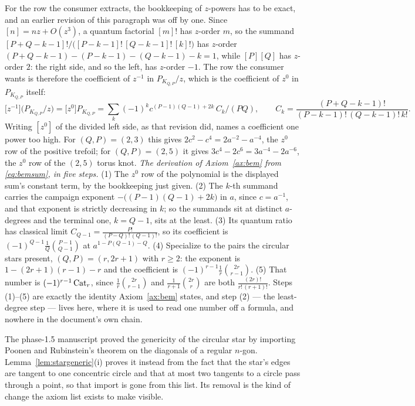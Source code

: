 \begin{remark}
For the row the consumer extracts, the bookkeeping of $z$-powers has to be
exact, and an earlier revision of this paragraph was off by one. Since
$[n]=nz+O(z^3)$, a quantum factorial $[m]!$ has $z$-order $m$, so the summand
$[P+Q-k-1]!/\bigl([P-k-1]!\,[Q-k-1]!\,[k]!\bigr)$ has $z$-order
$(P+Q-k-1)-(P-k-1)-(Q-k-1)-k=1$, while $[P][Q]$ has $z$-order $2$: the right
side, and so the left, has $z$-order $-1$. The row the consumer wants is
therefore the coefficient of $z^{-1}$ in $P_{K_{Q,P}}/z$, which is the
coefficient of $z^0$ in $P_{K_{Q,P}}$ itself:
\[
   \bigl[z^{-1}\bigr]\bigl(P_{K_{Q,P}}/z\bigr)
   =\bigl[z^{0}\bigr]P_{K_{Q,P}}
   =\sum_k(-1)^k c^{(P-1)(Q-1)+2k}\,C_k/(PQ),
   \qquad
   C_k=\frac{(P+Q-k-1)!}{(P-k-1)!\,(Q-k-1)!\,k!} .
\]
Writing $[z^0]$ of the divided left side, as that revision did, names a
coefficient one power too high. For $(Q,P)=(2,3)$ this gives
$2c^{2}-c^{4}=2a^{-2}-a^{-4}$, the $z^0$ row of the positive trefoil; for
$(Q,P)=(2,5)$ it gives $3c^{4}-2c^{6}=3a^{-4}-2a^{-6}$, the $z^0$ row of the
$(2,5)$ torus knot. \emph{The derivation of Axiom~\ref{ax:bem} from \eqref{eq:bemsum}, in five
steps.} (1) The $z^0$ row of the polynomial is the displayed sum's constant
term, by the bookkeeping just given. (2) The $k$-th summand carries the campaign
exponent $-\bigl((P-1)(Q-1)+2k\bigr)$ in $a$, since $c=a^{-1}$, and that
exponent is strictly decreasing in $k$; so the summands sit at distinct
$a$-degrees and the terminal one, $k=Q-1$, sits at the least. (3) Its quantum
ratio has classical limit
$C_{Q-1}=\frac{P!}{(P-Q)!\,(Q-1)!}$, so its coefficient is
$(-1)^{Q-1}\frac1Q\binom{P-1}{Q-1}$ at $a^{1-P(Q-1)-Q}$. (4) Specialize to the
pairs the circular stars present, $(Q,P)=(r,2r+1)$ with $r\geq2$: the exponent
is $1-(2r+1)(r-1)-r$ and the coefficient is
$(-1)^{r-1}\frac1r\binom{2r}{r-1}$. (5) That number is $(-1)^{r-1}\operatorname{Cat}_r$,
since $\frac1r\binom{2r}{r-1}$ and $\frac1{r+1}\binom{2r}{r}$ are both
$\frac{(2r)!}{r!\,(r+1)!}$. Steps (1)--(5) are exactly the identity
Axiom~\ref{ax:bem} states, and step (2) --- the least-degree step --- lives
here, where it is used to read one number off a formula, and nowhere in the
document's own chain.
\end{remark}

\begin{remark}\label{rem:prremoved}
The phase-1.5 manuscript proved the genericity of the circular star by
importing Poonen and Rubinstein's theorem on the diagonals of a regular
$n$-gon. Lemma~\ref{lem:stargeneric}(i) proves it instead from the fact that the
star's edges are tangent to one concentric circle and that at most two tangents
to a circle pass through a point, so that import is gone from this list. Its
removal is the kind of change the axiom list exists to make visible.
\end{remark}

